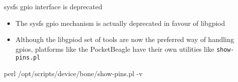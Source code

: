 \begin{frame}
   {sysfs gpio interface is deprecated}
   \begin{itemize}
      \item The sysfs gpio mechanism is actually deprecated in favour of libgpiod
      \item Although the libgpiod set of tools are now the preferred way of handling
	      gpios, platforms like the PocketBeagle have their own utilities
	      like \verb?show-pins.pl?
   \end{itemize}
   \begin{raw}
perl /opt/scripts/device/bone/show-pins.pl -v
   \end{raw}
\end{frame}

\cprotect\note{

}

